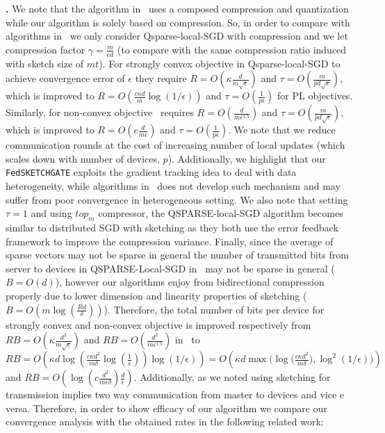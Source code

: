 \documentclass[sigconf, anonymous, review]{acmart}
\begin{document}
\noindent\textbf{\citep{basu2019qsparse}.}  We note that the algorithm in~\cite{basu2019qsparse} uses a composed compression and quantization while our algorithm is solely based on compression. 
So, in order to compare with algorithms in~\cite{basu2019qsparse} we only consider Qsparse-local-SGD with compression and we let compression factor $\gamma=\frac{m}{cd}$ (to compare with the same compression ratio induced with sketch size of $mt$). For strongly convex objective in   Qsparse-local-SGD to achieve convergence error of $\epsilon$ they require $R=O\left(\kappa\frac{d}{m\sqrt{\epsilon}}\right)$ and $\tau=O\left(\frac{m}{pd\sqrt{\epsilon}}\right)$, which is improved to $R=O\left(\frac{c\kappa d}{m}\log (1/\epsilon)\right)$ and $\tau=O\left(\frac{1}{p\epsilon}\right)$ for PL \:   objectives. Similarly, for non-convex objective~\citep{basu2019qsparse} requires $R=O\left(\frac{d}{m\epsilon^{1.5}}\right)$ and $\tau=O\left(\frac{m}{pd\sqrt{\epsilon}}\right)$, which is improved to $R=O\left(c\frac{d}{m\epsilon}\right)$ and $\tau=O\left(\frac{1}{p\epsilon}\right)$. We note that we reduce communication rounds at the cost of increasing number of local updates (which scales down with number of devices, $p$). Additionally, we highlight that our \texttt{FedSKETCHGATE} exploits the gradient tracking idea to deal with data heterogeneity, while algorithms in~\cite{basu2019qsparse} does not develop such mechanism and may suffer from poor convergence in heterogeneous setting. We also note that setting $\tau=1$ and using $top_{m}$ compressor, the QSPARSE-local-SGD algorithm becomes similar to distributed SGD with sketching as they both use the error feedback framework to improve the compression variance.  
Finally, since the average of sparse vectors may not be sparse in general the number of transmitted bits from server to devices in QSPARSE-Local-SGD in~\cite{basu2019qsparse} may not be sparse in general ($B=O(d)$), however our algorithms enjoy from bidirectional compression properly due to lower dimension and linearity properties of sketching ($B=O(m\log(\frac{Rd}{\delta}))$). Therefore, the total number of bits per device for strongly convex and non-convex objective is improved respectively from $RB=O\left(\kappa\frac{d^2}{m\sqrt{\epsilon}}\right)$ and $RB=O\left(\frac{d^2}{m\epsilon^{1.5}}\right)$ in~\cite{basu2019qsparse} to $RB=O\left({\kappa d\log(\frac{c\kappa d^2}{m\delta}\log (\frac{1}{\epsilon})) }\log (1/\epsilon)\right)=O\left({\kappa d\max\Big(\log(\frac{c\kappa d^2}{m\delta}}),\log^2 (1/\epsilon)\Big)\right)$ and $RB=O\left(\log(c\frac{d^2}{m\epsilon\delta})\frac{d}{\epsilon}\right)$.
Additionally, as we noted using sketching for transmission implies two way communication from master to devices and vice e versa. Therefore, in order to show efficacy of our algorithm we compare our convergence analysis with the obtained rates in the following related work:
\end{document}
